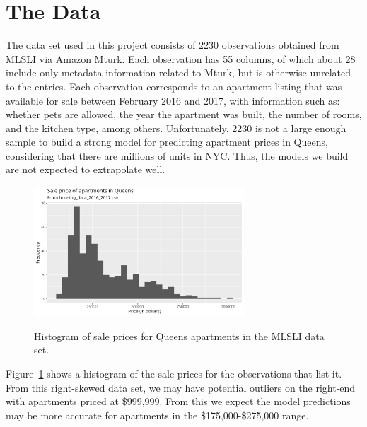 \documentclass[11pt]{article}
\begin{document}
	\section{The Data}
	The data set used in this project consists of 2230 observations obtained
	from MLSLI via Amazon Mturk. Each observation has 55 columns, of which about 28
	include only metadata information related to Mturk, but is otherwise unrelated
	to the entries. Each observation corresponds to an
	apartment listing that was available for sale between February 2016 and 2017,
	with information such as: whether pets are allowed, the year the apartment was
	built, the number of rooms, and the kitchen type, among others. Unfortunately,
	2230 is not a large enough sample to build a strong model for predicting
	apartment prices in Queens, considering that there are millions of units in NYC.
	Thus, the models we build are not expected to extrapolate well.
	\begin{figure}
		\centering
		\includegraphics[width=0.7\textwidth]{apartment_sale_price_histogram.png}
		\label{fig:sale-price-hist}
		\caption{Histogram of sale prices for Queens apartments in the MLSLI data set.}
	\end{figure}
	Figure~\ref{fig:sale-price-hist} shows a histogram
	of the sale prices for the observations that list it. From this
	right-skewed data set, we may have potential outliers on the right-end
	with apartments priced at \$999,999. From this we expect the model predictions
	may be more accurate for apartments in the \$175,000-\$275,000 range.
\end{document}
